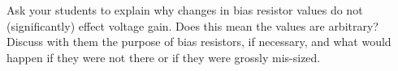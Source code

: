 Ask your students to explain why changes in bias resistor values do not (significantly) effect voltage gain.  Does this mean the values are arbitrary?  Discuss with them the purpose of bias resistors, if necessary, and what would happen if they were not there or if they were grossly mis-sized.




